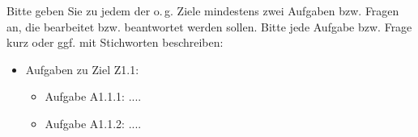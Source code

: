 Bitte geben Sie zu jedem der o.\,g. Ziele mindestens zwei Aufgaben bzw. Fragen an, die bearbeitet bzw. beantwortet werden sollen. Bitte jede Aufgabe bzw. Frage kurz oder ggf. mit Stichworten beschreiben:

\begin{itemize}
\item Aufgaben zu Ziel Z1.1:
	\begin{itemize}
	\item Aufgabe A1.1.1: ....
	\item Aufgabe A1.1.2: ....
	\end{itemize}
\end{itemize}
